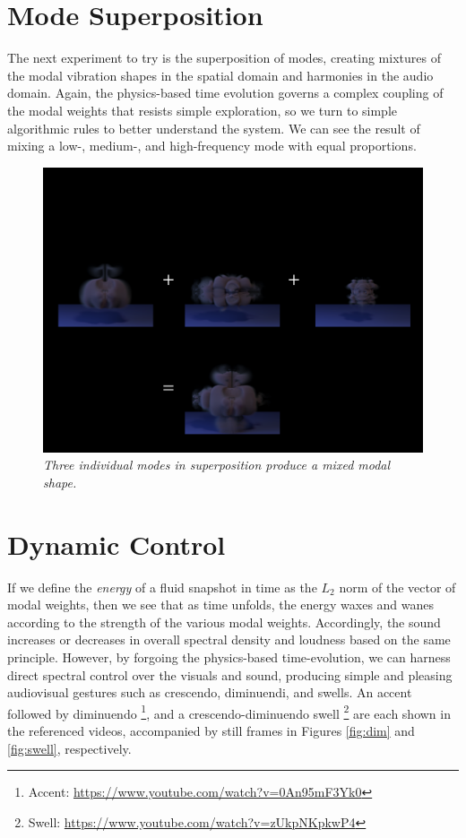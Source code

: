 \section{Mode Superposition}
The next experiment to try is the superposition of modes, creating mixtures of the modal vibration shapes in the spatial domain and harmonies in the audio domain. Again, the physics-based time evolution governs a complex coupling of the modal weights that resists simple exploration, so we turn to simple algorithmic rules to better understand the system. We can see the result of mixing a low-, medium-, and high-frequency mode with equal proportions.

\begin{figure}[H]
	\centering
	\includegraphics[width=\textwidth]{chap6/figures/superposition.png}
	\caption{\em Three individual modes in superposition produce a mixed modal shape.}
\label{fig:superposition}
\end{figure}

\section{Dynamic Control}
If we define the {\em energy} of a fluid snapshot in time as the $L_2$ norm of the vector of modal weights, then we see that as time unfolds, the energy waxes and wanes according to the strength
of the various modal weights. Accordingly, the sound increases or decreases in overall spectral density and loudness based on the same principle. However, by forgoing the physics-based time-evolution,
we can harness direct spectral control over the visuals and sound, producing simple and pleasing audiovisual gestures such as crescendo, diminuendi, and swells. An accent followed by diminuendo \footnote{Accent: \url{https://www.youtube.com/watch?v=0An95mF3Yk0}}, and a crescendo-diminuendo swell \footnote{Swell: \url{https://www.youtube.com/watch?v=zUkpNKpkwP4}} are each shown in the referenced videos, accompanied by still frames in Figures \ref{fig:dim} and \ref{fig:swell}, respectively.

